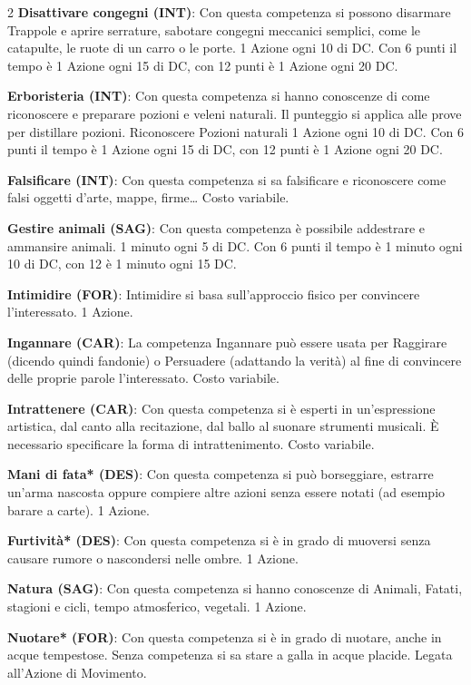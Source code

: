 \begin{multicols}{2}
\textbf{Disattivare congegni (INT)}: Con questa competenza si possono disarmare Trappole e aprire serrature, sabotare congegni meccanici semplici, come le catapulte, le ruote di un carro o le porte. 1 Azione ogni 10 di DC. Con 6 punti il tempo è 1 Azione ogni 15 di DC, con 12 punti è 1 Azione ogni 20 DC.

\textbf{Erboristeria (INT)}: Con questa competenza si hanno conoscenze di come riconoscere e preparare pozioni e veleni naturali. Il punteggio si applica alle prove per distillare pozioni. Riconoscere Pozioni naturali 1 Azione ogni 10 di DC. Con 6 punti il tempo è 1 Azione ogni 15 di DC, con 12 punti è 1 Azione ogni 20 DC.

\textbf{Falsificare (INT)}: Con questa competenza si sa falsificare e riconoscere come falsi oggetti d'arte, mappe, firme… Costo variabile.

\textbf{Gestire animali (SAG)}: Con questa competenza è possibile addestrare e ammansire animali. 1 minuto ogni 5 di DC. Con 6 punti il tempo è 1 minuto ogni 10 di DC, con 12 è 1 minuto ogni 15 DC.

\textbf{Intimidire (FOR)}: Intimidire si basa sull'approccio fisico per convincere l'interessato. 1 Azione.

\textbf{Ingannare (CAR)}: La competenza Ingannare può essere usata per Raggirare (dicendo quindi fandonie) o Persuadere (adattando la verità) al fine di convincere delle proprie parole l'interessato. Costo variabile.

\textbf{Intrattenere (CAR)}: Con questa competenza si è esperti in un'espressione artistica, dal canto alla recitazione, dal ballo al suonare strumenti musicali. È necessario specificare la forma di intrattenimento. Costo variabile.

\textbf{Mani di fata* (DES)}: Con questa competenza si può borseggiare, estrarre un'arma nascosta oppure compiere altre azioni senza essere notati (ad esempio barare a carte). 1 Azione.

\textbf{Furtività* (DES)}: Con questa competenza si è in grado di muoversi senza causare rumore o nascondersi nelle ombre. 1 Azione.

\textbf{Natura (SAG)}: Con questa competenza si hanno conoscenze di Animali, Fatati, stagioni e cicli, tempo atmosferico, vegetali. 1 Azione.

\textbf{Nuotare* (FOR)}: Con questa competenza si è in grado di nuotare, anche in acque tempestose. Senza competenza si sa stare a galla in acque placide. Legata all'Azione di Movimento.


\end{multicols}
